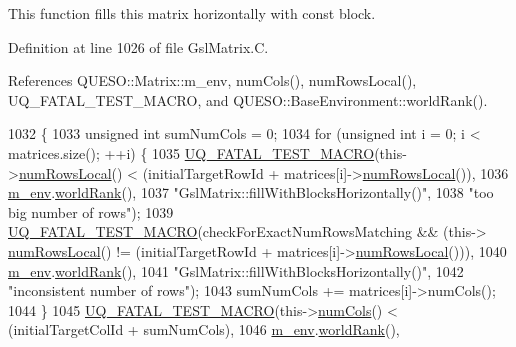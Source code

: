 This function fills {\ttfamily this} matrix horizontally with const block. 



Definition at line 1026 of file Gsl\-Matrix.\-C.



References Q\-U\-E\-S\-O\-::\-Matrix\-::m\-\_\-env, num\-Cols(), num\-Rows\-Local(), U\-Q\-\_\-\-F\-A\-T\-A\-L\-\_\-\-T\-E\-S\-T\-\_\-\-M\-A\-C\-R\-O, and Q\-U\-E\-S\-O\-::\-Base\-Environment\-::world\-Rank().


\begin{DoxyCode}
1032 \{
1033   \textcolor{keywordtype}{unsigned} \textcolor{keywordtype}{int} sumNumCols = 0;
1034   \textcolor{keywordflow}{for} (\textcolor{keywordtype}{unsigned} \textcolor{keywordtype}{int} i = 0; i < matrices.size(); ++i) \{
1035     \hyperlink{_defines_8h_a56d63d18d0a6d45757de47fcc06f574d}{UQ\_FATAL\_TEST\_MACRO}(this->\hyperlink{class_q_u_e_s_o_1_1_gsl_matrix_ab5ec937a9fd439eef1a87e12c0dbccb4}{numRowsLocal}() < (initialTargetRowId + 
      matrices[i]->\hyperlink{class_q_u_e_s_o_1_1_gsl_matrix_ab5ec937a9fd439eef1a87e12c0dbccb4}{numRowsLocal}()),
1036                         \hyperlink{class_q_u_e_s_o_1_1_matrix_a247fb0fc0b87fecdee054bb4660b68e8}{m\_env}.\hyperlink{class_q_u_e_s_o_1_1_base_environment_a78b57112bbd0e6dd0e8afec00b40ffa7}{worldRank}(),
1037                         \textcolor{stringliteral}{"GslMatrix::fillWithBlocksHorizontally()"},
1038                         \textcolor{stringliteral}{"too big number of rows"});
1039     \hyperlink{_defines_8h_a56d63d18d0a6d45757de47fcc06f574d}{UQ\_FATAL\_TEST\_MACRO}(checkForExactNumRowsMatching && (this->
      \hyperlink{class_q_u_e_s_o_1_1_gsl_matrix_ab5ec937a9fd439eef1a87e12c0dbccb4}{numRowsLocal}() != (initialTargetRowId + matrices[i]->\hyperlink{class_q_u_e_s_o_1_1_gsl_matrix_ab5ec937a9fd439eef1a87e12c0dbccb4}{numRowsLocal}())),
1040                         \hyperlink{class_q_u_e_s_o_1_1_matrix_a247fb0fc0b87fecdee054bb4660b68e8}{m\_env}.\hyperlink{class_q_u_e_s_o_1_1_base_environment_a78b57112bbd0e6dd0e8afec00b40ffa7}{worldRank}(),
1041                         \textcolor{stringliteral}{"GslMatrix::fillWithBlocksHorizontally()"},
1042                         \textcolor{stringliteral}{"inconsistent number of rows"});
1043     sumNumCols += matrices[i]->numCols();
1044   \}
1045   \hyperlink{_defines_8h_a56d63d18d0a6d45757de47fcc06f574d}{UQ\_FATAL\_TEST\_MACRO}(this->\hyperlink{class_q_u_e_s_o_1_1_gsl_matrix_ad5005f168fe030468e834776afb1859b}{numCols}() < (initialTargetColId + sumNumCols),
1046                       \hyperlink{class_q_u_e_s_o_1_1_matrix_a247fb0fc0b87fecdee054bb4660b68e8}{m\_env}.\hyperlink{class_q_u_e_s_o_1_1_base_environment_a78b57112bbd0e6dd0e8afec00b40ffa7}{worldRank}(),

\end{DoxyCode}
